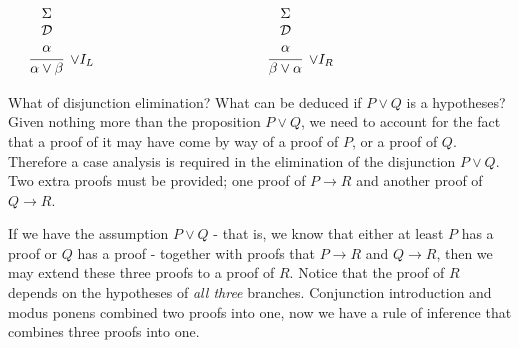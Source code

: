 \documentclass{book}
\begin{document}
        \begin{center}
            $\begin{array} { c c c }
            
                \begin{array}{ c c }		
                    \begin{array}{c}		
                        \infer[\lor I_{L}]{\alpha \lor \beta}
                        {\begin{array}{c} \Sigma \\ \mathcal{D} \\ \alpha \end{array}}
                    \end{array}
                \end{array}
    
            & \hspace{3cm} &
    
            \begin{array}{ c c }		
                \begin{array}{c}		
                    \infer[\lor I_{R}]{\beta \lor \alpha}
                    {\begin{array}{c} \Sigma \\ \mathcal{D} \\ \alpha \end{array}}
                \end{array}
            \end{array}	\\		
    
            \end{array}$
        \end{center}	
    

    What of disjunction elimination? What can be deduced if $P \lor Q$ is a hypotheses? Given nothing more than the proposition $P \lor Q$, we need to account for the fact that a proof of it may have come by way of a proof of $P$, or a proof of $Q$. Therefore a case analysis is required in the elimination of the disjunction $P \lor Q$. Two extra proofs must be provided; one proof of $P \to R$ and another proof of $Q \to R$. 

    If we have the assumption $P \lor Q$ - that is, we know that either at least $P$ has a proof or $Q$ has a proof - together with proofs that $P \to R$ and $Q \to R$, then we may extend these three proofs to a proof of $R$. Notice that the proof of $R$ depends on the hypotheses of \emph{all three} branches. Conjunction introduction and modus ponens combined two proofs into one, now we have a rule of inference that combines three proofs into one. 
\end{document}
